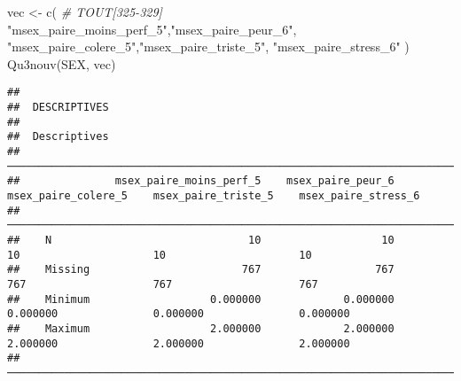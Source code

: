 \documentclass[
]{article}
\newenvironment{Shaded}{\begin{snugshade}}{\end{snugshade}}
\newcommand{\CommentTok}[1]{\textcolor[rgb]{0.56,0.35,0.01}{\textit{#1}}}
\newcommand{\FunctionTok}[1]{\textcolor[rgb]{0.00,0.00,0.00}{#1}}
\newcommand{\NormalTok}[1]{#1}
\newcommand{\OtherTok}[1]{\textcolor[rgb]{0.56,0.35,0.01}{#1}}
\newcommand{\StringTok}[1]{\textcolor[rgb]{0.31,0.60,0.02}{#1}}
\begin{document}
\begin{Shaded}
\begin{Highlighting}[]
\NormalTok{vec }\OtherTok{\textless{}{-}} \FunctionTok{c}\NormalTok{(  }\CommentTok{\# TOUT[325{-}329]}
  \StringTok{"msex\_paire\_moins\_perf\_5"}\NormalTok{,}\StringTok{"msex\_paire\_peur\_6"}\NormalTok{,                           }
  \StringTok{"msex\_paire\_colere\_5"}\NormalTok{,}\StringTok{"msex\_paire\_triste\_5"}\NormalTok{,                              }
  \StringTok{"msex\_paire\_stress\_6"}
\NormalTok{  )}
\FunctionTok{Qu3nouv}\NormalTok{(SEX, vec)}
\end{Highlighting}
\end{Shaded}

\begin{verbatim}
## 
##  DESCRIPTIVES
## 
##  Descriptives                                                                                                                     
##  ──────────────────────────────────────────────────────────────────────────────────────────────────────────────────────────────── 
##               msex_paire_moins_perf_5    msex_paire_peur_6    msex_paire_colere_5    msex_paire_triste_5    msex_paire_stress_6   
##  ──────────────────────────────────────────────────────────────────────────────────────────────────────────────────────────────── 
##    N                               10                   10                     10                     10                     10   
##    Missing                        767                  767                    767                    767                    767   
##    Minimum                   0.000000             0.000000               0.000000               0.000000               0.000000   
##    Maximum                   2.000000             2.000000               2.000000               2.000000               2.000000   
##  ────────────────────────────────────────────────────────────────────────────────────────────────────────────────────────────────
\end{verbatim}
\end{document}
